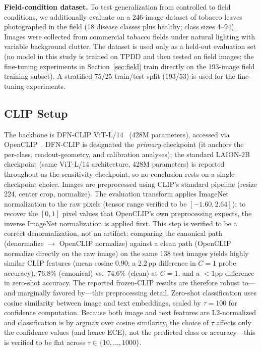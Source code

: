 \documentclass[10pt,a4paper]{article}
\begin{document}
\textbf{Field-condition dataset.} To test generalization from controlled to field conditions, we additionally evaluate on a 246-image dataset of tobacco leaves photographed in the field (18 disease classes plus healthy; class sizes 4--94). Images were collected from commercial tobacco fields under natural lighting with variable background clutter. The dataset is used only as a held-out evaluation set (no model in this study is trained on TPDD and then tested on field images; the fine-tuning experiments in Section~\ref{sec:field} train directly on the 193-image field training subset). A stratified 75/25 train/test split (193/53) is used for the fine-tuning experiments.

\subsection{CLIP Setup}

The backbone is DFN-CLIP ViT-L/14~\cite{fang2023data} (428M parameters), accessed via OpenCLIP~\cite{cherti2023reproducible}.
DFN-CLIP is designated the \emph{primary} checkpoint (it anchors the per-class, readout-geometry, and calibration analyses); the standard LAION-2B checkpoint (same ViT-L/14 architecture, 428M parameters) is reported throughout as the sensitivity checkpoint, so no conclusion rests on a single checkpoint choice.
Images are preprocessed using CLIP's standard pipeline (resize 224, center crop, normalize). The evaluation transform applies ImageNet normalization to the raw pixels (tensor range verified to be $[-1.60,2.64]$); to recover the $[0,1]$ pixel values that OpenCLIP's own preprocessing expects, the inverse ImageNet normalization is applied first. This step is verified to be a correct denormalization, not an artifact: comparing the canonical path (denormalize $\to$ OpenCLIP normalize) against a clean path (OpenCLIP normalize directly on the raw image) on the same 138 test images yields highly similar CLIP features (mean cosine $0.90$; a $2.2$\,pp difference in $C{=}1$ probe accuracy), $76.8\%$ (canonical) vs.\ $74.6\%$ (clean) at $C{=}1$, and a $<1$pp difference in zero-shot accuracy. The reported frozen-CLIP results are therefore robust to---and marginally favored by---this preprocessing detail.
Zero-shot classification uses cosine similarity between image and text embeddings, scaled by $\tau=100$ for confidence computation.
Because both image and text features are L2-normalized and classification is by argmax over cosine similarity, the choice of $\tau$ affects only the confidence values (and hence ECE), not the predicted class or accuracy---this is verified to be flat across $\tau\in\{10,\dots,1000\}$.
\end{document}
